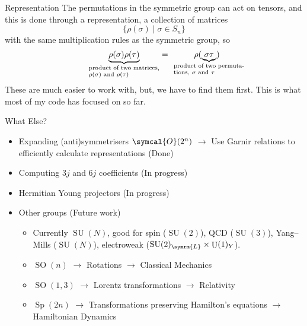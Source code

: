 \documentclass{beamer}
\newcommand{\define}[1]{\alert{#1}}
\DeclareMathOperator{\specialUnitary}{SU}
\DeclareMathOperator{\unitary}{U}
\DeclareMathOperator{\specialOrthogonal}{SO}
\DeclareMathOperator{\symplectic}{Sp}
\begin{document}
    \begin{frame}{Representation}
        The permutations in the symmetric group can act on tensors, and this is done through a \define{representation}, a collection of matrices
        \begin{equation*}
            \{\rho(\sigma) \mid \sigma \in S_n\}
        \end{equation*}
        with the same multiplication rules as the symmetric group, so
        \begin{equation*}
            \underbrace{\rho(\sigma)\rho(\tau)}_{\parbox{3cm}{\scriptsize product of two matrices, \(\rho(\sigma)\) and \(\rho(\tau)\)}} = \hspace{1cm} \rho(\underbrace{\sigma\tau}_{\mathclap{\parbox{3cm}{\scriptsize product of two permutations, \(\sigma\) and \(\tau\)}}})
        \end{equation*}
        These are much easier to work with, but, we have to find them first.
        This is what most of my code has focused on so far.
    \end{frame}
    
    
    \begin{frame}{What Else?}
        \begin{itemize}
            \item\pause Expanding (anti)symmetrisers \(\symcal{O}(2^n)\) \(\to\) Use Garnir relations to efficiently calculate representations (Done)
            \item\pause Computing \(3j\) and \(6j\) coefficients (In progress)
            \item\pause Hermitian Young projectors (In progress)
            \item\pause Other groups (Future work)
            \begin{itemize}
                \item\pause Currently \(\specialUnitary(N)\), good for spin (\(\specialUnitary(2)\)), QCD (\(\specialUnitary(3)\)), Yang--Mills (\(\specialUnitary(N)\)), electroweak (\(\specialUnitary(2)_{\symrm{L}} \times \unitary(1)_{Y}\)).
                \item\pause \(\specialOrthogonal(n)\) \(\to\) Rotations \(\to\) Classical Mechanics
                \item\pause \(\specialOrthogonal(1, 3)\) \(\to\) Lorentz transformations \(\to\) Relativity
                \item\pause \(\symplectic(2n)\) \(\to\) Transformations preserving Hamilton's equations \(\to\) Hamiltonian Dynamics
            \end{itemize}
        \end{itemize}
    \end{frame}
    
\end{document}
